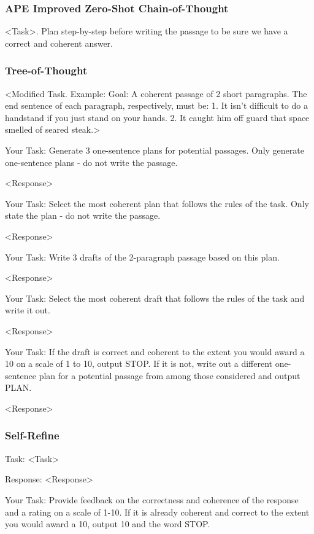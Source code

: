 \documentclass[11pt]{article}
\begin{document}
\subsubsection*{APE Improved Zero-Shot Chain-of-Thought}

<Task>. Plan step-by-step before writing the passage to be sure we have a correct and coherent answer.

\subsubsection*{Tree-of-Thought}

<Modified Task. Example: Goal: A coherent passage of 2 short paragraphs. The end sentence of each paragraph, respectively, must be: 1. It isn't difficult to do a handstand if you just stand on your hands. 2. It caught him off guard that space smelled of seared steak.>

Your Task: Generate 3 one-sentence plans for potential passages. Only generate one-sentence plans - do not write the passage.

<Response>

Your Task: Select the most coherent plan that follows the rules of the task. Only state the plan - do not write the passage.

<Response>

Your Task: Write 3 drafts of the 2-paragraph passage based on this plan.

<Response>

Your Task: Select the most coherent draft that follows the rules of the task and write it out.

<Response>

Your Task: If the draft is correct and coherent to the extent you would award a 10 on a scale of 1 to 10, output STOP. If it is not, write out a different one-sentence plan for a potential passage from among those considered and output PLAN.

<Response>

\subsubsection*{Self-Refine}

Task: <Task>

Response: <Response>

Your Task: Provide feedback on the correctness and coherence of the response and a rating on a scale of 1-10. If it is already coherent and correct to the extent you would award a 10, output 10 and the word STOP.
\end{document}
